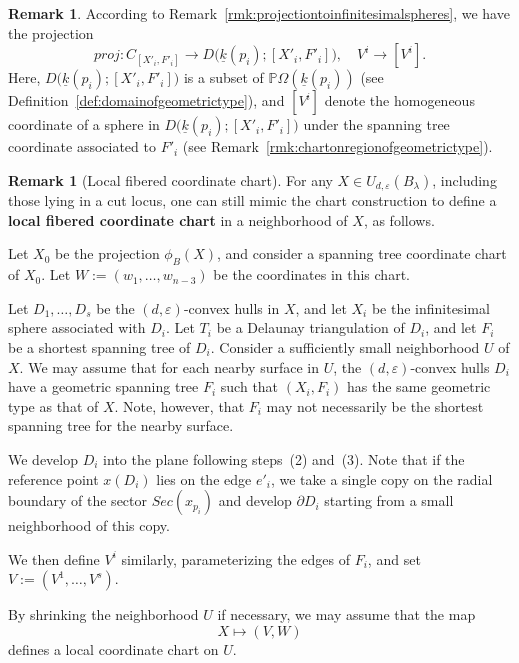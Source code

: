 \documentclass{compositio}
\numberwithin{equation}{section}
\numberwithin{figure}{section}
\theoremstyle{definition}
\newtheorem{remark}[definition]{Remark}
\theoremstyle{plain}
\begin{document}
{\begin{remark}\label{rmk:specificprojectiontoinfinitesimalspheres}
    According to Remark~\ref{rmk:projectiontoinfinitesimalspheres}, we have the projection
    $$
    proj: C_{[X'_i, F'_i]} \to D\big(\underline{k}(p_i); [X'_i,F'_i]\big),\quad V^i\to [V^i].
    $$
    Here, $D\big(\underline{k}(p_i); [X'_i,F'_i]\big)$ is a subset of $\mathbb{P}\Omega(\underline{k}(p_i))$ (see Definition~\ref{def:domainofgeometrictype}), and $[V^i]$ denote the homogeneous coordinate of a sphere in $D\Big(\underline{k}(p_i); [X'_i,F'_i]\Big)$ under the spanning tree coordinate associated to $F'_i$ (see Remark~\ref{rmk:chartonregionofgeometrictype}).
\end{remark}

\begin{remark}[Local fibered coordinate chart]\label{rmk:localfiberedchart}
For any $X \in U_{d,\varepsilon}(B_{\lambda})$, including those lying in a cut locus, one can still mimic the chart construction to define a \textbf{local fibered coordinate chart} in a neighborhood of $X$, as follows.

Let $X_0$ be the projection $\phi_B(X)$, and consider a spanning tree coordinate chart of $X_0$. Let $W := (w_1, \ldots, w_{n-3})$ be the coordinates in this chart.

Let $D_1, \ldots, D_s$ be the $(d,\varepsilon)$-convex hulls in $X$, and let $X_i$ be the infinitesimal sphere associated with $D_i$. Let $T_i$ be a Delaunay triangulation of $D_i$, and let $F_i$ be a shortest spanning tree of $D_i$. Consider a sufficiently small neighborhood $U$ of $X$. We may assume that for each nearby surface in $U$, the $(d,\varepsilon)$-convex hulls $D_i$ have a geometric spanning tree $F_i$ such that $(X_i, F_i)$ has the same geometric type as that of $X$. Note, however, that $F_i$ may not necessarily be the shortest spanning tree for the nearby surface.

We develop $D_i$ into the plane following steps~(2) and~(3). Note that if the reference point $x(D_i)$ lies on the edge $e'_i$, we take a single copy on the radial boundary of the sector $Sec(x_{p_i})$ and develop $\partial D_i$ starting from a small neighborhood of this copy.

We then define $V^i$ similarly, parameterizing the edges of $F_i$, and set $V := (V^1, \ldots, V^s)$.

By shrinking the neighborhood $U$ if necessary, we may assume that the map
\begin{equation}\label{equ:localfiberedcoordinatechart}
    X\mapsto (V,W)
\end{equation}
defines a local coordinate chart on $U$.
\end{remark}

}
\end{document}

